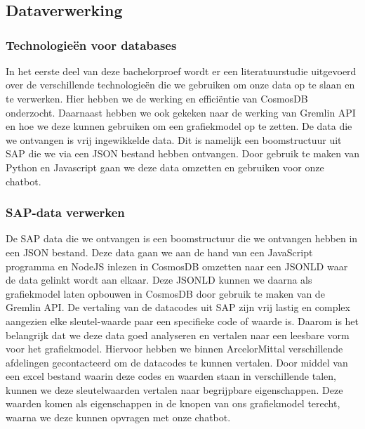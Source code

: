
\chapter{}%
\label{ch:methodologie}
\section{Dataverwerking}
\subsection{Technologieën voor databases}
In het eerste deel van deze bachelorproef wordt er een literatuurstudie uitgevoerd over de verschillende technologieën die we gebruiken om onze data op te slaan en te verwerken.
Hier hebben we de werking en efficiëntie van CosmosDB onderzocht. Daarnaast hebben we ook gekeken naar de werking van Gremlin API en hoe we deze kunnen gebruiken om een grafiekmodel op te zetten.
De data die we ontvangen is vrij ingewikkelde data. Dit is namelijk een boomstructuur uit SAP die we via een JSON bestand hebben ontvangen. 
Door gebruik te maken van Python en Javascript gaan we deze data omzetten en gebruiken voor onze chatbot.

\subsection{SAP-data verwerken}
De SAP data die we ontvangen is een boomstructuur die we ontvangen hebben in een JSON bestand. Deze data gaan we aan de hand van een JavaScript programma en NodeJS inlezen in CosmosDB omzetten naar een JSONLD waar de data gelinkt wordt aan elkaar.
Deze JSONLD kunnen we daarna als grafiekmodel laten opbouwen in CosmosDB door gebruik te maken van de Gremlin API.\@
De vertaling van de datacodes uit SAP zijn vrij lastig en complex aangezien elke sleutel-waarde paar een specifieke code of waarde is. Daarom is het belangrijk dat we deze data goed analyseren en vertalen naar een leesbare vorm voor het grafiekmodel.
Hiervoor hebben we binnen ArcelorMittal verschillende afdelingen gecontacteerd om de datacodes te kunnen vertalen. Door middel van een excel bestand waarin deze codes en waarden staan in verschillende talen, kunnen we deze sleutelwaarden vertalen naar begrijpbare eigenschappen.
Deze waarden komen als eigenschappen in de knopen van ons grafiekmodel terecht, waarna we deze kunnen opvragen met onze chatbot.

